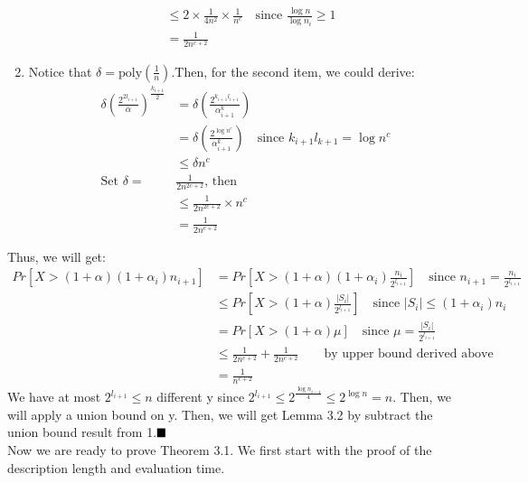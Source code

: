 \documentclass[a4paper, english]{paper}
\begin{document}
\begin{enumerate}
\begin{align*}
		& \le 2\times\frac1{4n^2}\times\frac1{n^c}\quad\text{since } \frac{\log n}{\log n_i} \ge 1\\
		& = \frac1{2n^{c+2}}
		\end{align*}
	\item Notice that $\delta=\text{poly}(\frac1n)$.Then, for the second item, we could derive:
		\begin{align*}
		\delta\left( \frac{2^{2l_{i+1}}}{\alpha}\right)^{\frac{k_{i+1}}2} &= \delta\left( \frac{2^{k_{i+1}l_{i+1}}}{\alpha^k_{i+1}}\right)\\
		& =  \delta\left( \frac{2^{\log n^c}}{\alpha^k_{i+1}}\right)\quad\text{since }k_{i+1}l_{k+1} = \log n^c\\
		& \le \delta n^c\\
		\text{Set }\delta = &\frac1{2n^{2c+2}}\text{, then}\\
		& \le \frac1{2n^{2c+2}}\times n^c\\
		& = \frac1{2n^{c+2}}
		\end{align*}
	\end{enumerate}
\quad	Thus, we will get:
	\begin{align*}
	Pr\left[X>(1+\alpha)(1+\alpha_i)n_{i+1}\right] &= Pr\left[X>(1+\alpha)(1+\alpha_i)\frac{n_i}{2^{l_{i+1}}}\right]\quad\text{since }n_{i+1} = \frac{n_i}{2^{l_{i+1}}}\\
	& \le Pr\left[X>(1+\alpha)\frac{|S_i|}{2^{l_{i+1}}}\right]\quad\text{since }|S_i|\le(1+\alpha_i)n_i\\
	& = Pr \left[X>(1+\alpha)\mu\right]\quad\text{since }\mu = \frac{|S_i|}{2^{l_{i+1}}}\\
	& \le \frac1{2n^{c+2}}+\frac1{2n^{c+2}}\qquad \text{by upper bound derived above}\\ 
	& = \frac1{n^{c+2}}
	\end{align*}
\quad	We have at most $2^{l_{i+1}}\le n$ different y since $2^{l_{i+1}}\le2^{\frac{\log n_{i-1}}4}\le 2^{\log n}=n$. Then, we will apply a union bound on y. Then, we will get Lemma 3.2 by subtract the union bound result from 1.$\hfill\blacksquare$ \\

 Now we are ready to prove Theorem 3.1. We first start with the proof of the description length and evaluation time.\\
	
\end{document}
